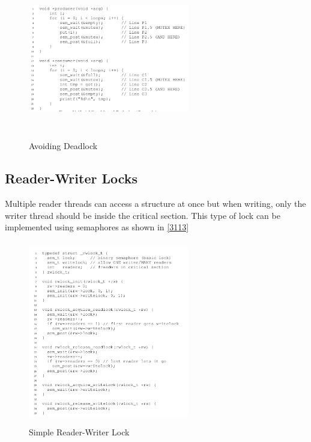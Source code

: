 \begin{figure}[h!]
    \label{3112}
    \begin{center}
        \includegraphics[width=7cm, height=7cm]{img/3112.png}
        \caption{Avoiding Deadlock}
    \end{center}
\end{figure}

\subsection{Reader-Writer Locks}

Multiple reader threads can access a structure at once but when writing, only
the writer thread should be inside the critical section. This type of lock can
be implemented using semaphores as shown in \ref{3113}

\begin{figure}[h!]
    \begin{center}
        \includegraphics[width=7cm, height=8cm]{img/3113.png}
        \caption{Simple Reader-Writer Lock}
    \end{center}
\end{figure}

